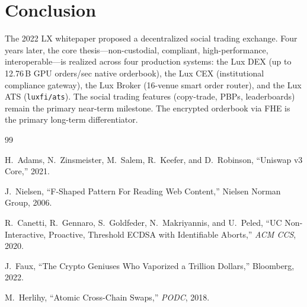 \section{Conclusion}


The 2022 LX whitepaper proposed a decentralized social trading
exchange. Four years later, the core thesis---non-custodial,
compliant, high-performance, interoperable---is realized across
four production systems: the Lux DEX (up to 12.76\,B GPU orders/sec native
orderbook), the Lux CEX (institutional compliance gateway), the
Lux Broker (16-venue smart order router), and the Lux ATS
(\texttt{luxfi/ats}). The social trading
features (copy-trade, PBPs, leaderboards) remain the primary
near-term milestone. The encrypted orderbook via FHE is the
primary long-term differentiator.


\begin{thebibliography}{99}

H.~Adams, N.~Zinsmeister, M.~Salem, R.~Keefer, and D.~Robinson,
``Uniswap v3 Core,'' 2021.

J.~Nielsen, ``F-Shaped Pattern For Reading Web Content,''
Nielsen Norman Group, 2006.

R.~Canetti, R.~Gennaro, S.~Goldfeder, N.~Makriyannis, and
U.~Peled, ``UC Non-Interactive, Proactive, Threshold ECDSA
with Identifiable Aborts,'' \textit{ACM CCS}, 2020.

J.~Faux, ``The Crypto Geniuses Who Vaporized a Trillion
Dollars,'' Bloomberg, 2022.

M.~Herlihy, ``Atomic Cross-Chain Swaps,'' \textit{PODC}, 2018.

\end{thebibliography}

